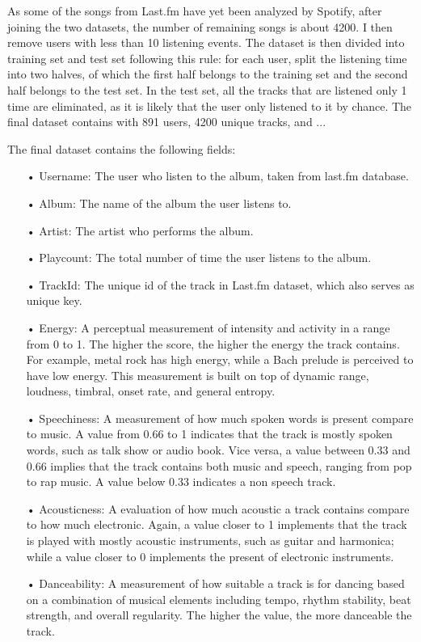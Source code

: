 As some of the songs from Last.fm have yet been analyzed by Spotify, after joining the two datasets, the number of remaining songs is about 4200. I then remove users with less than 10 listening events.
The dataset is then divided into training set and test set following this rule: for each user, split the listening time into two halves, of which the first half belongs to the training set and the second half belongs to the test set. In the test set, all the tracks that are listened only 1 time are eliminated, as it is likely that the user only listened to it by chance. The final dataset contains with 891 users, 4200 unique tracks, and ...

\noindent The final dataset contains the following fields:

\begin{itemize}
\item[•] Username: The user who listen to the album, taken from last.fm database.
\item[•] Album: The name of the album the user listens to.
\item[•] Artist: The artist who performs the album.
\item[•] Playcount: The total number of time the user listens to the album.
\item[•] TrackId: The unique id of the track in Last.fm dataset, which also serves as unique key.
\item[•] Energy: A perceptual measurement of intensity and activity in a range from 0 to 1. The higher the score, the higher the energy the track contains. For example, metal rock has high energy, while a Bach prelude is perceived to have low energy. This measurement is built on top of dynamic range, loudness, timbral, onset rate, and general entropy.
\item[•] Speechiness: A measurement of how much spoken words is present compare to music. A value from 0.66 to 1 indicates that the track is mostly spoken words, such as talk show or audio book. Vice versa, a value between 0.33 and 0.66 implies that the track contains both music and speech, ranging from pop to rap music. A value below 0.33 indicates a non speech track. 
\item[•] Acousticness: A evaluation of how much acoustic a track contains compare to how much electronic. Again, a value closer to 1 implements that the track is played with mostly acoustic instruments, such as guitar and harmonica; while a value closer to 0 implements the present of electronic instruments.
\item[•] Danceability: A measurement of how suitable a track is for dancing based on a combination of musical elements including tempo, rhythm stability,  beat strength, and overall regularity. The higher the value, the more danceable the track.

\end{itemize}

